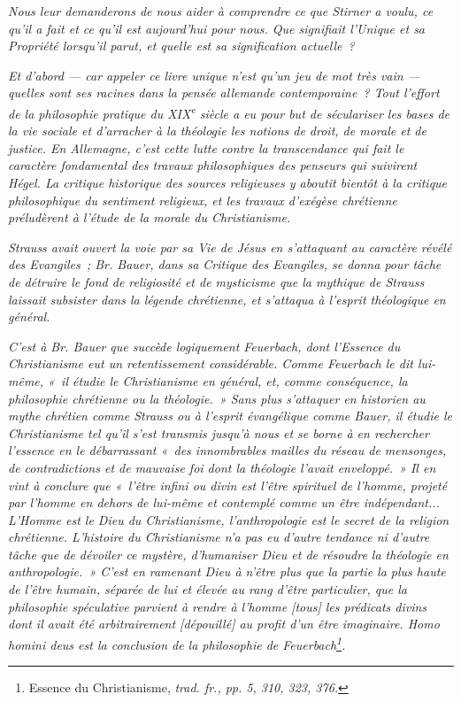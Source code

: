 \documentclass[french,twoside]{book} %
\newcommand\corr[1]{#1}
\begin{document}
\emph{Nous leur demanderons de nous aider à comprendre ce que Stirner a voulu, ce qu’il a fait et ce qu’il est aujourd’hui  pour nous. Que signifiait l’\emph{Unique et sa Propriété} lorsqu’il parut, et quelle est sa signification actuelle ?}\par
\emph{Et d’abord — car appeler ce livre \emph{unique} n’est qu’un jeu de mot très vain — quelles sont ses racines dans la pensée allemande contemporaine ? Tout l’effort de la philosophie pratique du XIX\textsuperscript{e} siècle a eu pour but de séculariser les bases de la vie sociale et d’arracher à la théologie les notions de droit, de morale et de justice. En Allemagne, c’est cette lutte contre la transcendance qui fait le caractère fondamental des travaux philosophiques des penseurs qui suivirent Hégel. La critique historique des sources religieuses y aboutit bientôt à la critique philosophique du sentiment religieux, et les travaux d’exégèse chrétienne préludèrent à l’étude de la morale du Christianisme.}\par
\emph{Strauss avait ouvert la voie par sa \emph{Vie de Jésus} en s’attaquant au caractère révélé des Evangiles ; Br. Bauer, dans sa \emph{Critique des Evangiles}, se donna pour tâche de détruire le fond de religiosité et de mysticisme que la mythique de Strauss laissait subsister dans la légende chrétienne, et s’attaqua à l’esprit théologique en général.}\par
\emph{C’est à Br. Bauer que succède logiquement Feuerbach, dont l’\emph{Essence du Christianisme} eut un retentissement considérable. Comme Feuerbach le dit lui-même, « il étudie le Christianisme en général, et, comme conséquence, la philosophie chrétienne ou la théologie. » Sans plus s’attaquer en historien au mythe chrétien comme Strauss ou à l’esprit évangélique comme Bauer, il étudie le Christianisme tel qu’il s’est transmis jusqu’à nous et se borne à en rechercher l’essence en le débarrassant « des innombrables mailles du réseau de mensonges, de contradictions et de mauvaise foi dont la théologie l’avait enveloppé. » Il en vint à conclure que « l’être infini ou divin est l’être spirituel de l’homme, projeté par l’homme en dehors de lui-même et contemplé comme un être indépendant... L’Homme est le Dieu du Christianisme, l’anthropologie est le secret de la religion chrétienne. L’histoire du Christianisme n’a pas eu d’autre tendance ni d’autre tâche que de dévoiler ce mystère, d’humaniser Dieu et de résoudre la  théologie en anthropologie. » C’est en ramenant Dieu à n’être plus que la partie la plus haute de l’être humain, séparée de lui et élevée au rang d’être particulier, que la philosophie spéculative parvient à rendre à l’homme [{\corr tous}] les prédicats divins dont il avait été arbitrairement [{\corr dépouillé}] au profit d’un être imaginaire. \emph{Homo homini deus} est la conclusion de la philosophie de Feuerbach\footnote{ \noindent Essence du Christianisme, \emph{trad. fr., pp. 5, 310, 323, 376.}
 }.}\par
\end{document}
